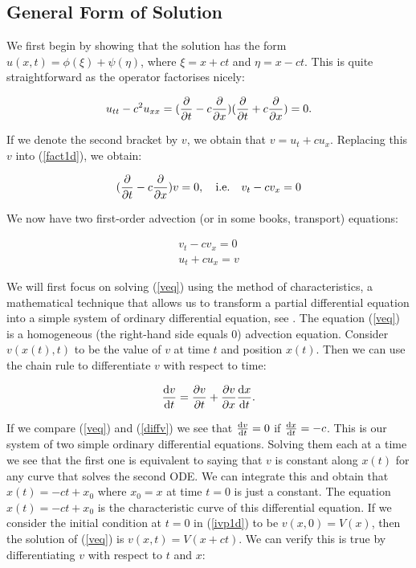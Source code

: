 \documentclass[a4paper, 12pt]{article}
\numberwithin{equation}{section}
\begin{document}
\subsection{General Form of Solution}

We first begin by showing that the solution has the form $u(x, t)=\phi(\xi)+\psi(\eta)$, where $\xi=x+ct$ and $\eta=x-ct$. This is quite straightforward
as the operator factorises nicely:

\begin{equation} \label{fact1d}
    u_{tt}-c^2u_{xx}=(\diffp[1]{}{t} - c \diffp[1]{}{x})(\diffp[1]{}{t} + c \diffp[1]{}{x})=0.
\end{equation}

If we denote the second bracket by $v$, we obtain that $v=u_t+cu_x$. Replacing this $v$ into (\ref{fact1d}), we obtain:

\begin{equation*} 
    (\diffp[1]{}{t} -c \diffp[1]{}{x})v=0, \quad \textrm{i.e.} \quad v_t-cv_x=0
\end{equation*}

We now have two first-order advection (or in some books, transport) equations:

\begin{align}
    v_t-cv_x=0 \label{veq}\\
    u_t+cu_x=v \label{ueq}
\end{align}

We will first focus on solving (\ref{veq}) using the method of characteristics, a mathematical technique that allows us to transform a partial differential
equation into a simple system of ordinary differential equation, see \cite{Ev}. The equation (\ref{veq}) is a homogeneous (the right-hand side equals $0$) 
advection equation. Consider $v(x(t),t)$ to be the value of $v$ at time $t$ and position $x(t)$. Then we can use the chain rule to differentiate
$v$ with respect to time:

\begin{equation} \label{diffv}
    \diff{v}{t}=\diffp[1]{v}{t}+\diffp[1]{v}{x}\diff{x}{t}.
\end{equation}

If we compare (\ref{veq}) and (\ref{diffv}) we see that $\diff{v}{t}=0$ if $\diff{x}{t}=-c$. This is our system of two simple ordinary differential 
equations. Solving them each at a time we see that the first one is equivalent to saying that $v$ is constant along $x(t)$ for any curve that 
solves the second ODE. We can integrate this and obtain that $x(t)=-ct+x_0$ where $x_0=x$ at time $t=0$ is just a constant. The equation $x(t)=-ct+x_0$
is the characteristic curve of this differential equation. If we consider the initial condition at $t=0$ in (\ref{ivp1d}) to be $v(x,0)=V(x)$, then the 
solution of (\ref{veq}) is $v(x,t)=V(x+ct)$. We can verify this is true by differentiating $v$ with respect to $t$ and $x$:
\end{document}
